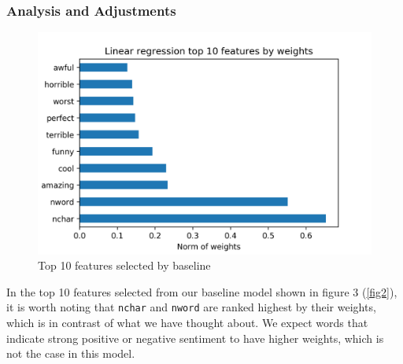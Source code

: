 \documentclass{article}
\begin{document}
\subsubsection{Analysis and Adjustments}
\begin{figure}
\begin{center}
\includegraphics[scale=0.6]{top_10_linear}
\caption{Top 10 features selected by baseline}
\end{center}
\end{figure}
In the top 10 features selected from our baseline model shown in figure 3 (\ref{fig2}), it is worth noting that \texttt{nchar} and \texttt{nword} are ranked highest by
their weights, which is in contrast of what we have thought about. We 
expect words that indicate strong positive or negative sentiment to have
higher weights, which is not the case in this model. \\
\end{document}
